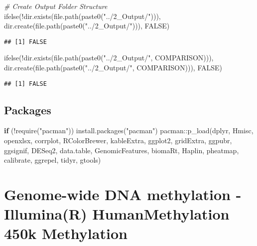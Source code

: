 \documentclass[
  10pt,
]{article}
\newenvironment{Shaded}{\begin{snugshade}}{\end{snugshade}}
\newcommand{\CommentTok}[1]{\textcolor[rgb]{0.56,0.35,0.01}{\textit{#1}}}
\newcommand{\ConstantTok}[1]{\textcolor[rgb]{0.00,0.00,0.00}{#1}}
\newcommand{\ControlFlowTok}[1]{\textcolor[rgb]{0.13,0.29,0.53}{\textbf{#1}}}
\newcommand{\FunctionTok}[1]{\textcolor[rgb]{0.00,0.00,0.00}{#1}}
\newcommand{\NormalTok}[1]{#1}
\newcommand{\SpecialCharTok}[1]{\textcolor[rgb]{0.00,0.00,0.00}{#1}}
\newcommand{\StringTok}[1]{\textcolor[rgb]{0.31,0.60,0.02}{#1}}
\begin{document}
\begin{Shaded}
\begin{Highlighting}[]
\CommentTok{\# Create Output Folder Structure}
\FunctionTok{ifelse}\NormalTok{(}\SpecialCharTok{!}\FunctionTok{dir.exists}\NormalTok{(}\FunctionTok{file.path}\NormalTok{(}\FunctionTok{paste0}\NormalTok{(}\StringTok{"../2\_Output/"}\NormalTok{))), }\FunctionTok{dir.create}\NormalTok{(}\FunctionTok{file.path}\NormalTok{(}\FunctionTok{paste0}\NormalTok{(}\StringTok{"../2\_Output/"}\NormalTok{))), }\ConstantTok{FALSE}\NormalTok{)}
\end{Highlighting}
\end{Shaded}

\begin{verbatim}
## [1] FALSE
\end{verbatim}

\begin{Shaded}
\begin{Highlighting}[]
\FunctionTok{ifelse}\NormalTok{(}\SpecialCharTok{!}\FunctionTok{dir.exists}\NormalTok{(}\FunctionTok{file.path}\NormalTok{(}\FunctionTok{paste0}\NormalTok{(}\StringTok{"../2\_Output/"}\NormalTok{, COMPARISON))), }\FunctionTok{dir.create}\NormalTok{(}\FunctionTok{file.path}\NormalTok{(}\FunctionTok{paste0}\NormalTok{(}\StringTok{"../2\_Output/"}\NormalTok{, COMPARISON))), }\ConstantTok{FALSE}\NormalTok{)}
\end{Highlighting}
\end{Shaded}

\begin{verbatim}
## [1] FALSE
\end{verbatim}

\hypertarget{packages}{%
\subsection{Packages}\label{packages}}

\begin{Shaded}
\begin{Highlighting}[]
\ControlFlowTok{if}\NormalTok{ (}\SpecialCharTok{!}\FunctionTok{require}\NormalTok{(}\StringTok{"pacman"}\NormalTok{)) }\FunctionTok{install.packages}\NormalTok{(}\StringTok{"pacman"}\NormalTok{)}
\NormalTok{pacman}\SpecialCharTok{::}\FunctionTok{p\_load}\NormalTok{(dplyr, Hmisc, openxlsx, corrplot, RColorBrewer, kableExtra, ggplot2, gridExtra, ggpubr, ggsignif, DESeq2, data.table, GenomicFeatures, biomaRt, Haplin, pheatmap, calibrate, ggrepel, tidyr, gtools)}
\end{Highlighting}
\end{Shaded}

\hypertarget{genome-wide-dna-methylation---illuminar-humanmethylation-450k-methylation}{%
\section{Genome-wide DNA methylation - Illumina(R) HumanMethylation 450k
Methylation}\label{genome-wide-dna-methylation---illuminar-humanmethylation-450k-methylation}}
\end{document}
